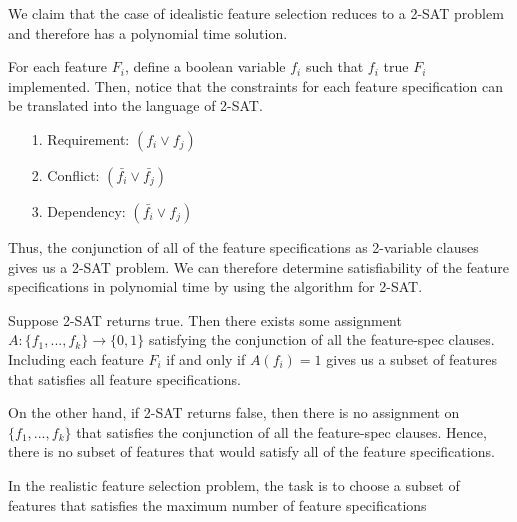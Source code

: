 \documentclass{article}
\begin{document}
\begin{solution}
We claim that the case of idealistic feature selection reduces to a 2-SAT problem and therefore has a polynomial time solution.

For each feature \( F_i \), define a boolean variable \( f_i \) such that \( f_i \) true \iff \( F_i \) implemented. Then, notice that the constraints for each feature specification can be translated into the language of 2-SAT.
\begin{enumerate}
    \item [1.] Requirement: \( (f_i \lor f_j) \)
    \item [2.] Conflict: \( (\bar{f_i} \lor \bar{f_j}) \)
    \item [3.] Dependency: \( (\bar{f_i} \lor f_j) \)
\end{enumerate}
Thus, the conjunction of all of the feature specifications as 2-variable clauses gives us a 2-SAT problem.
We can therefore determine satisfiability of the feature specifications in polynomial time by using the algorithm for 2-SAT.

\begin{subproof}[Correctness.]
Suppose 2-SAT returns true. Then there exists some assignment
\( A: \{f_1, ..., f_k\} \rightarrow \{0,1\} \) satisfying the conjunction of all the feature-spec clauses.
Including each feature \( F_i \) if and only if \( A(f_i) = 1 \) gives us a subset of features that satisfies all feature specifications.

On the other hand, if 2-SAT returns false, then there is no assignment on \( \{f_1, ..., f_k\} \) that satisfies the conjunction of all the feature-spec clauses.
Hence, there is no subset of features that would satisfy all of the feature specifications.
\end{subproof}

\end{solution}
\pagebreak




\begin{subexercise}
In the realistic feature selection problem, the task is to choose a subset of features that satisfies the maximum number of feature specifications
\end{subexercise}
\end{document}
